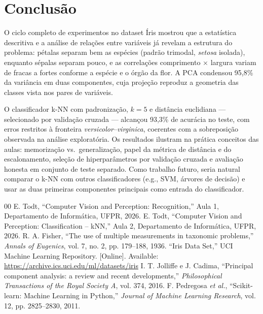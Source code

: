 \documentclass[conference]{IEEEtran}
\begin{document}
\section{Conclusão}
\label{sec:conclusao}
O ciclo completo de experimentos no dataset Íris mostrou que a estatística descritiva e a análise de relações entre variáveis já revelam a estrutura do problema: pétalas separam bem as espécies (padrão trimodal, \textit{setosa} isolada), enquanto sépalas separam pouco, e as correlações comprimento $\times$ largura variam de fracas a fortes conforme a espécie e o órgão da flor. A PCA condensou 95,8\% da variância em duas componentes, cuja projeção reproduz a geometria das classes vista nos pares de variáveis.

O classificador k-NN com padronização, $k=5$ e distância euclidiana — selecionado por validação cruzada — alcançou 93,3\% de acurácia no teste, com erros restritos à fronteira \textit{versicolor}--\textit{virginica}, coerentes com a sobreposição observada na análise exploratória. Os resultados ilustram na prática conceitos das aulas: memorização vs.\ generalização, papel da métrica de distância e do escalonamento, seleção de hiperparâmetros por validação cruzada e avaliação honesta em conjunto de teste separado. Como trabalho futuro, seria natural comparar o k-NN com outros classificadores (e.g., SVM, árvores de decisão) e usar as duas primeiras componentes principais como entrada do classificador.

\begin{thebibliography}{00}
 E. Todt, ``Computer Vision and Perception: Recognition,'' Aula 1, Departamento de Informática, UFPR, 2026.
 E. Todt, ``Computer Vision and Perception: Classification -- kNN,'' Aula 2, Departamento de Informática, UFPR, 2026.
 R. A. Fisher, ``The use of multiple measurements in taxonomic problems,'' \textit{Annals of Eugenics}, vol. 7, no. 2, pp. 179--188, 1936.
 ``Iris Data Set,'' UCI Machine Learning Repository. [Online]. Available: \url{https://archive.ics.uci.edu/ml/datasets/iris}
 I. T. Jolliffe e J. Cadima, ``Principal component analysis: a review and recent developments,'' \textit{Philosophical Transactions of the Royal Society A}, vol. 374, 2016.
 F. Pedregosa \textit{et al.}, ``Scikit-learn: Machine Learning in Python,'' \textit{Journal of Machine Learning Research}, vol. 12, pp. 2825--2830, 2011.
\end{thebibliography}
\end{document}
